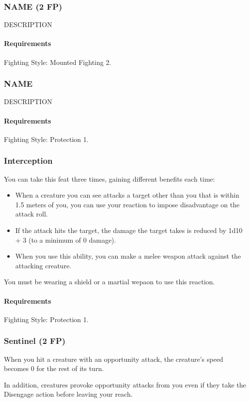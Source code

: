 \subsubsection{NAME (2 FP)} \label{feat::name}
    DESCRIPTION
    \paragraph{Requirements} Fighting Style: Mounted Fighting 2.
\subsubsection{NAME} \label{feat::name}
    DESCRIPTION
    \paragraph{Requirements} Fighting Style: Protection 1.
\subsubsection{Interception} \label{feat::interception}
    You can take this feat three times, gaining different benefits each time:
    \begin{itemize}
        \item When a creature you can see attacks a target other than you that is within 1.5 meters of you, you can use your reaction to impose disadvantage on the attack roll.
        \item If the attack hits the target, the damage the target takes is reduced by 1d10 + 3 (to a minimum of 0 damage).
        \item When you use this ability, you can make a melee weapon attack against the attacking creature.
    \end{itemize}
    You must be wearing a shield or a martial wepaon to use this reaction.
    \paragraph{Requirements} Fighting Style: Protection 1.
\subsubsection{Sentinel (2 FP)} \label{feat::sentinel}
    When you hit a creature with an opportunity attack, the creature's speed becomes 0 for the rest of its turn.

    In addition, creatures provoke opportunity attacks from you even if they take the Disengage action before leaving your reach.
